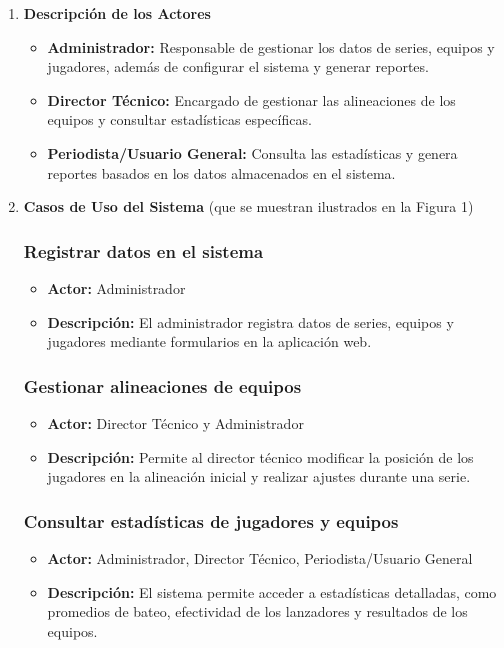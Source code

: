 \documentclass{report}
\begin{document}
        \begin{enumerate}
        \item \textbf{Descripción de los Actores}

            \begin{itemize}
                \item \textbf{Administrador:} Responsable de gestionar los datos de series, equipos y jugadores, además de configurar el sistema y generar reportes.
                \item \textbf{Director Técnico:} Encargado de gestionar las alineaciones de los equipos y consultar estadísticas específicas.
                \item \textbf{Periodista/Usuario General:} Consulta las estadísticas y genera reportes basados en los datos almacenados en el sistema.
            \end{itemize}

        \item \textbf{Casos de Uso del Sistema} (que se muestran ilustrados en la Figura 1)
            
            \subsubsection{Registrar datos en el sistema}
            \begin{itemize}
                \item \textbf{Actor:} Administrador
                \item \textbf{Descripción:} El administrador registra datos de series, equipos y jugadores mediante formularios en la aplicación web.
            \end{itemize}

            \subsubsection{Gestionar alineaciones de equipos}
            \begin{itemize}
                \item \textbf{Actor:} Director Técnico y Administrador
                \item \textbf{Descripción:} Permite al director técnico modificar la posición de los jugadores en la alineación inicial y realizar ajustes durante una serie.
            \end{itemize}

            \subsubsection{Consultar estadísticas de jugadores y equipos}
            \begin{itemize}
                \item \textbf{Actor:} Administrador, Director Técnico, Periodista/Usuario General
                \item \textbf{Descripción:} El sistema permite acceder a estadísticas detalladas, como promedios de bateo, efectividad de los lanzadores y resultados de los equipos.
            \end{itemize}


\end{enumerate}
\end{document}
